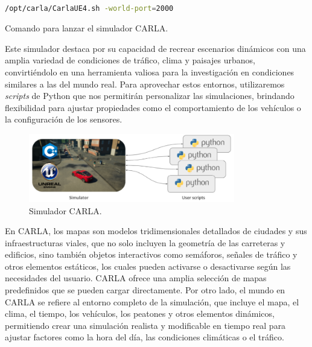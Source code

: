 \begin{code}[h]
\begin{lstlisting}[language=bash]

/opt/carla/CarlaUE4.sh -world-port=2000

\end{lstlisting}
\caption[Comando para lanzar el simulador CARLA]{Comando para lanzar el simulador CARLA.}
\label{cod:cmdcarla}
\end{code}

Este simulador destaca por su capacidad de recrear escenarios dinámicos con una amplia variedad de condiciones de tráfico, clima y paisajes urbanos, convirtiéndolo en una herramienta valiosa para la investigación en condiciones similares a las del mundo real. Para aprovechar estos entornos, utilizaremos \textit{scripts} de Python que nos permitirán personalizar las simulaciones, brindando flexibilidad para ajustar propiedades como el comportamiento de los vehículos o la configuración de los sensores.

\begin{figure}[ht]
\begin{center}
\includegraphics[width=9cm]{figs/Plataformas_Desarollo/carla.png}
\end{center}
\caption{Simulador CARLA.}
\label{carla}
\end{figure}

\newpage 

En CARLA, los mapas son modelos tridimensionales detallados de ciudades y sus infraestructuras viales, que no solo incluyen la geometría de las carreteras y edificios, sino también objetos interactivos como semáforos, señales de tráfico y otros elementos estáticos, los cuales pueden activarse o desactivarse según las necesidades del usuario. CARLA ofrece una amplia selección de mapas predefinidos que se pueden cargar directamente. Por otro lado, el mundo en CARLA se refiere al entorno completo de la simulación, que incluye el mapa, el clima, el tiempo, los vehículos, los peatones y otros elementos dinámicos, permitiendo crear una simulación realista y modificable en tiempo real para ajustar factores como la hora del día, las condiciones climáticas o el tráfico.

